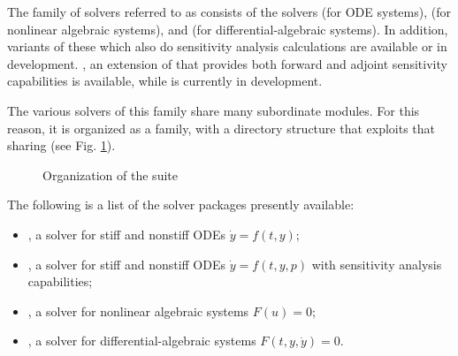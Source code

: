%
The family of solvers referred to as {\sundials} consists of the solvers
{\cvode} (for ODE systems), {\kinsol} (for nonlinear algebraic
systems), and {\ida} (for differential-algebraic systems).  In addition,
variants of these which also do sensitivity analysis calculations are
available or in development. {\cvodes}, an extension of {\cvode} that
provides both forward and adjoint sensitivity capabilities is available,
while {\idas} is currently in development.

The various solvers of this family share many subordinate modules.
For this reason, it is organized as a family, with a directory
structure that exploits that sharing (see Fig. \ref{f:sunorg}).
\begin{figure}
\caption {Organization of the {\sundials} suite}\label{f:sunorg}
\end{figure}
The following is a list of the solver packages presently available:
\begin{itemize}

\item {\cvode},  
  a solver for stiff and nonstiff ODEs $\dot y = f(t,y)$;

\item {\cvodes},
  a solver for stiff and nonstiff ODEs $\dot y = f(t,y,p)$
  with sensitivity analysis capabilities;

\item {\kinsol}, 
  a solver for nonlinear algebraic systems $F(u) = 0$;

\item {\ida},
  a solver for differential-algebraic systems $F(t,y,\dot y) = 0$.

\end{itemize}
